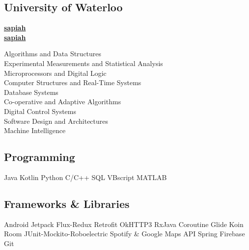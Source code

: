 \documentclass[a4paper]{resume}
\begin{document}

\begin{minipage}[t]{0.33\textwidth} 


\subsection{University of Waterloo}
\vspace{\topsep} %
\sectionsep


 \href{https://github.com/sapiah}{\bf sapiah} \\
 \href{https://www.linkedin.com/in/sapiah/}{\bf sapiah}
\sectionsep


Algorithms and Data Structures \\
Experimental Measurements and Statistical Analysis \\
Microprocessors and Digital Logic \\
Computer Structures and Real-Time Systems \\
Database Systems \\
Co-operative and Adaptive Algorithms \\
Digital Control Systems \\ 
Software Design and Architectures \\
Machine Intelligence \\ 
\sectionsep


\subsection{Programming}
Java \textbullet{}   Kotlin \textbullet{} Python \textbullet{} C/C++ \textbullet{} SQL  \textbullet{}
VBscript \textbullet{} MATLAB 
\sectionsep
\subsection{Frameworks \& Libraries}
Android Jetpack \textbullet{} Flux-Redux \textbullet{} Retrofit \textbullet{} OkHTTP3 \textbullet{} RxJava \textbullet{} Coroutine\textbullet{} Glide \textbullet{} Koin\textbullet{} Room \textbullet{} JUnit-Mockito-Roboelectric \textbullet{} Spotify \& Google Maps API  \textbullet{} Spring \textbullet{} Firebase \textbullet{} Git
\sectionsep


\end{minipage}
\end{document}
